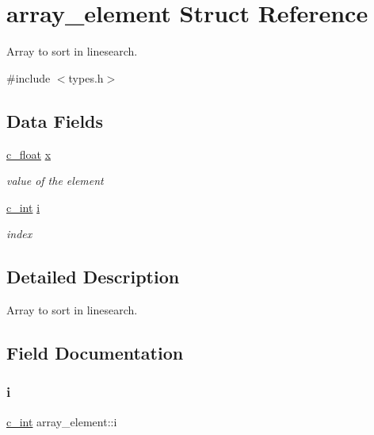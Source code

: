 \hypertarget{structarray__element}{}\section{array\+\_\+element Struct Reference}
\label{structarray__element}


Array to sort in linesearch.  




{\ttfamily \#include $<$types.\+h$>$}

\subsection*{Data Fields}
\begin{DoxyCompactItemize}
\item 
\mbox{\hyperlink{global__opts_8h_a7f1a9fda95e52979658c20a0d134fb15}{c\+\_\+float}} \mbox{\hyperlink{structarray__element_a7f98237eb20c339e84d18f056876c620}{x}}
\begin{DoxyCompactList}\small\item\em value of the element \end{DoxyCompactList}\item 
\mbox{\hyperlink{global__opts_8h_aa3217a0f49d3e52b74e9dd830c44472f}{c\+\_\+int}} \mbox{\hyperlink{structarray__element_a6b0dd951f8a6136ea151bf9d2cfcf65c}{i}}
\begin{DoxyCompactList}\small\item\em index \end{DoxyCompactList}\end{DoxyCompactItemize}


\subsection{Detailed Description}
Array to sort in linesearch. 

\subsection{Field Documentation}
\mbox{\label{structarray__element_a6b0dd951f8a6136ea151bf9d2cfcf65c}} 
\subsubsection{\texorpdfstring{i}{i}}
{\footnotesize\ttfamily \mbox{\hyperlink{global__opts_8h_aa3217a0f49d3e52b74e9dd830c44472f}{c\+\_\+int}} array\+\_\+element\+::i}



